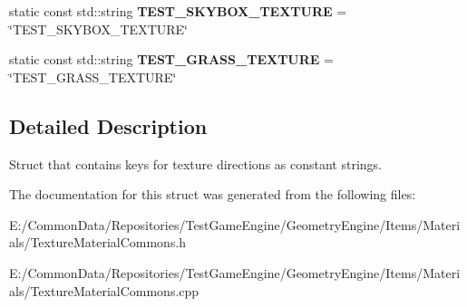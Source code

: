 \begin{DoxyCompactItemize}
\item 
\mbox{\label{struct_geometry_engine_1_1_geometry_material_1_1_texture_constant_a9da12e082b0b180fe7c96ec39bedc2ae}} 
static const std\+::string {\bfseries T\+E\+S\+T\+\_\+\+S\+K\+Y\+B\+O\+X\+\_\+\+T\+E\+X\+T\+U\+RE} = \char`\"{}T\+E\+S\+T\+\_\+\+S\+K\+Y\+B\+O\+X\+\_\+\+T\+E\+X\+T\+U\+RE\char`\"{}
\item 
\mbox{\label{struct_geometry_engine_1_1_geometry_material_1_1_texture_constant_abf989db156197ba625a6cfdb69a70fad}} 
static const std\+::string {\bfseries T\+E\+S\+T\+\_\+\+G\+R\+A\+S\+S\+\_\+\+T\+E\+X\+T\+U\+RE} = \char`\"{}T\+E\+S\+T\+\_\+\+G\+R\+A\+S\+S\+\_\+\+T\+E\+X\+T\+U\+RE\char`\"{}
\end{DoxyCompactItemize}


\subsection{Detailed Description}
Struct that contains keys for texture directions as constant strings. 

The documentation for this struct was generated from the following files\+:\begin{DoxyCompactItemize}
\item 
E\+:/\+Common\+Data/\+Repositories/\+Test\+Game\+Engine/\+Geometry\+Engine/\+Items/\+Materials/Texture\+Material\+Commons.\+h\item 
E\+:/\+Common\+Data/\+Repositories/\+Test\+Game\+Engine/\+Geometry\+Engine/\+Items/\+Materials/Texture\+Material\+Commons.\+cpp\end{DoxyCompactItemize}

